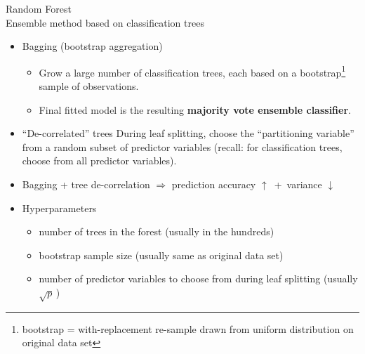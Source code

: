 \begin{frame}{\vskip -0.3cm \LARGE Random Forest\\{\small Ensemble method based on classification trees}}

\scriptsize
\begin{itemize}
\item
	{\small Bagging (bootstrap aggregation)}
	\vskip -0.15cm
	\begin{itemize}
	\item
		{\scriptsize Grow a {\color{red}large} number of classification trees,
		each based on a bootstrap\!\!\footnote{\tiny bootstrap = with-replacement re-sample
		drawn from uniform distribution on original data set}
		sample of observations.}
	\item
		{\scriptsize Final fitted model is the resulting \textbf{majority vote ensemble classifier}.}
	\end{itemize}

\vskip 0.2cm
\item
	{\small ``De-correlated'' trees}
	\vskip 0.05cm
	During leaf splitting, choose the ``partitioning variable''
	from a {\color{red}random subset} of predictor variables
	(recall: for classification trees, choose from all predictor variables).

\vskip 0.4cm
\item
	{\small Bagging + tree de-correlation $\Longrightarrow$
	prediction accuracy $\uparrow$ \,+\, variance $\downarrow$}

\vskip 0.4cm
\item
	{\small Hyperparameters}
	\vskip -0.15cm
	\begin{itemize}
	\item
		{\scriptsize number of trees in the forest (usually in the hundreds)}
	\item
		{\scriptsize bootstrap sample size (usually same as original data set)}
	\item
		{\scriptsize number of predictor variables to choose from during leaf splitting (usually $\sqrt{p}$\,)}
	\end{itemize}
\end{itemize}

\end{frame}
\normalsize

